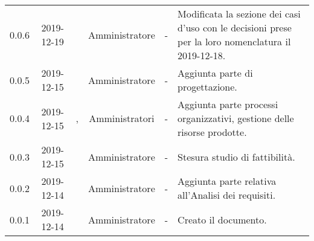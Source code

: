 {\begin{longtable}{ c c  C{2.5cm} c C{3cm} C{3.5cm}}
0.0.6 & 2019-12-19 & \CE{} & Amministratore & - & Modificata la sezione dei casi d’uso con le decisioni prese per la loro nomenclatura il 2019-12-18. \\

0.0.5 & 2019-12-15 & \SE{} & Amministratore & - & Aggiunta parte di progettazione. \\

0.0.4 & 2019-12-15 & \BR{}, \PF{} & Amministratori & - & Aggiunta parte processi organizzativi, gestione delle risorse prodotte. \\

0.0.3 & 2019-12-15 & \MC{} & Amministratore & - & Stesura studio di fattibilità. \\

0.0.2 & 2019-12-14 & \CE{} & Amministratore & - & Aggiunta parte relativa all’Analisi dei requisiti. \\

0.0.1 & 2019-12-14 & \CE{} & Amministratore & - & Creato il documento. \\
		
\end{longtable}
}